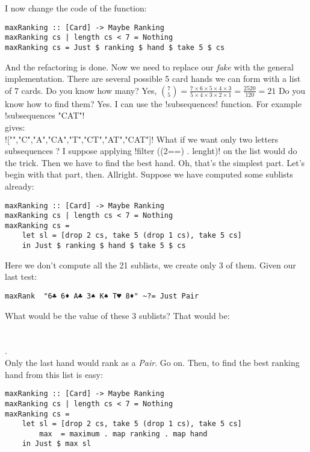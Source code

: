\lhA \error I now change the code of the function:
\begin{lstlisting}[frame=single]
maxRanking :: [Card] -> Maybe Ranking
maxRanking cs | length cs < 7 = Nothing
maxRanking cs = Just $ ranking $ hand $ take 5 $ cs
\end{lstlisting}
\success And the refactoring is done. Now we need to replace our \emph{fake} with the general implementation.
\lhN There are several possible 5 card hands we can form with a list of 7 cards. Do you know how many?
\lhA Yes, ${{7}\choose{5}} = \frac{7\times6 \times 5 \times 4 \times 3}{5 \times 4 \times 3 \times 2 \times 1} = \frac{2520}{120} = 21$
\lhN Do you know how to find them?
\lhA Yes. I can use the \il!subsequences! function. For example\\ 
\il!subsequences "CAT"! \\
gives: \\
\il!["","C","A","CA","T","CT","AT","CAT"]!
\lhN What if we want only two letters subsequences ?
\lhA I suppose applying \il!filter ((2==) . lenght)! on the list would do the trick.
\lhN Then we have to find the best hand.
\lhA Oh, that's the simplest part.
\lhN Let's begin with that part, then.
\lhA Allright. Suppose we have computed some sublists already:
\begin{lstlisting}[frame=single]
maxRanking :: [Card] -> Maybe Ranking
maxRanking cs | length cs < 7 = Nothing
maxRanking cs = 
    let sl = [drop 2 cs, take 5 (drop 1 cs), take 5 cs]
    in Just $ ranking $ hand $ take 5 $ cs
\end{lstlisting}
\success Here we don't compute all the 21 sublists, we create only 3 of them. 
\lhN Given our last test:
\begin{lstlisting}[frame=single]
maxRank  "6♣ 6♦ A♣ 3♠ K♠ T♥ 8♦" ~?= Just Pair
\end{lstlisting}
What would be the value of these 3 sublists?
\lhA That would be:\\
     \\ 
      \\
    . \\
Only the last hand would rank as a \emph{Pair}.
\lhN Go on.
\lhA Then, to find the best ranking hand from this list is easy:
\begin{lstlisting}[frame=single]
maxRanking :: [Card] -> Maybe Ranking
maxRanking cs | length cs < 7 = Nothing
maxRanking cs = 
    let sl = [drop 2 cs, take 5 (drop 1 cs), take 5 cs]
        max  = maximum . map ranking . map hand
    in Just $ max sl
\end{lstlisting} %
